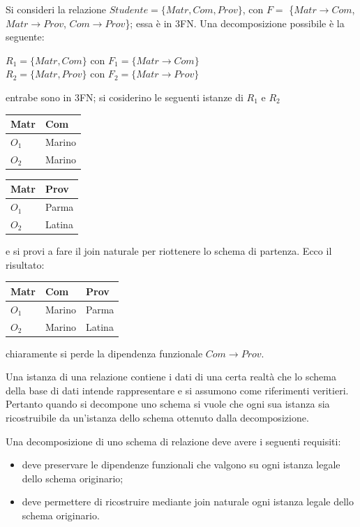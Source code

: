 \begin{exmp}
  Si consideri la relazione $Studente = \{Matr, Com, Prov\}$, con $F = $ \{$Matr\rightarrow Com$,
  $Matr\rightarrow Prov$, $Com\rightarrow Prov$\}; essa è in 3FN. Una decomposizione possibile è
  la seguente:
  \begin{center}
    $R_1 = \{Matr, Com\}$ con $F_1 = \{Matr\rightarrow Com\}$ \\
    $R_2 = \{Matr, Prov\}$ con $F_2 = \{Matr\rightarrow Prov\}$ \\
   \end{center}
  entrabe sono in 3FN; si cosiderino le seguenti istanze di $R_1$ e $R_2$
  \begin{multicols}{2}
  \begin{flushright} 
  \begin{tabular}{l | l }
  Matr & Com\\
  \hline
  $O_1$ & Marino\\
  $O_2$ & Marino
 \end{tabular}
 \end{flushright}
  
  \begin{flushleft}
   \begin{tabular}{ l | l}
  Matr & Prov \\
  \hline
  $O_1$ & Parma\\
  $O_2$ & Latina
 \end{tabular}
\end{flushleft}
\end{multicols}
e si provi a fare il join naturale per riottenere lo schema di partenza. Ecco il
risultato:
  \begin{center} 
  \begin{tabular}{l | l | l}
  Matr & Com & Prov\\
  \hline
  $O_1$ & Marino & Parma\\
  $O_2$ & Marino & Latina
 \end{tabular}
 \end{center}
 
 chiaramente si perde la dipendenza funzionale $Com\rightarrow Prov$.
\end{exmp}
Una istanza di una relazione contiene i dati di una certa realtà che lo schema della 
base di dati intende rappresentare e si assumono come riferimenti veritieri. Pertanto 
quando si decompone uno schema si vuole che ogni sua istanza sia ricostruibile da 
un'istanza dello schema ottenuto dalla decomposizione.
\begin{prop}
Una decomposizione di uno schema di relazione deve avere i seguenti requisiti:
\begin{itemize}
 \item deve preservare le dipendenze funzionali che valgono su ogni istanza legale dello 
 schema originario;
 \item deve permettere di ricostruire mediante join naturale ogni istanza legale 
 dello schema originario.
\end{itemize} 
\end{prop}

